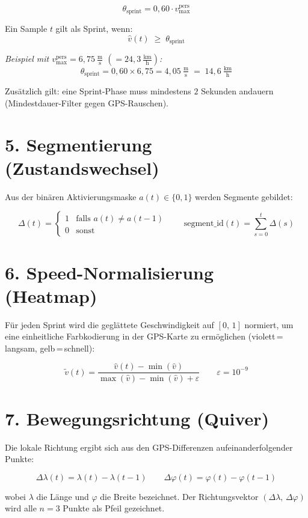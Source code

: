 \documentclass[a4paper, 11pt]{article}
\begin{document}
\[
  \theta_{\text{sprint}} = 0{,}60 \cdot v_{\max}^{\text{pers}}
\]

Ein Sample $t$ gilt als Sprint, wenn: \[\hat{v}(t) \;\geq\; \theta_{\text{sprint}}\]


\textit{Beispiel mit $v_{\max}^{\text{pers}} = 6{,}75\ \tfrac{\text{m}}{\text{s}}$
$(= 24{,}3\ \tfrac{\text{km}}{\text{h}})$:}
\[
  \theta_{\text{sprint}} = 0{,}60 \times 6{,}75 = 4{,}05\ \tfrac{\text{m}}{\text{s}}
  \;=\; 14{,}6\ \tfrac{\text{km}}{\text{h}}
\]

Zusätzlich gilt: eine Sprint-Phase muss mindestens $2$ Sekunden andauern
(Mindestdauer-Filter gegen GPS-Rauschen).

\section*{5. Segmentierung (Zustandswechsel)}

Aus der binären Aktivierungsmaske $a(t) \in \{0,1\}$ werden Segmente gebildet:

\[
  \Delta(t) =
  \begin{cases}
    1 & \text{falls } a(t) \neq a(t-1) \\
    0 & \text{sonst}
  \end{cases}
  \qquad
  \text{segment\_id}(t) = \sum_{s=0}^{t} \Delta(s)
\]

\section*{6. Speed-Normalisierung (Heatmap)}

Für jeden Sprint wird die geglättete Geschwindigkeit auf $[0,\,1]$ normiert,
um eine einheitliche Farbkodierung in der GPS-Karte zu ermöglichen
(violett\,=\,langsam, gelb\,=\,schnell):

\[
  \tilde{v}(t) = \frac{\hat{v}(t) - \min(\hat{v})}{\max(\hat{v}) - \min(\hat{v}) + \varepsilon}
  \qquad \varepsilon = 10^{-9}
\]

\section*{7. Bewegungsrichtung (Quiver)}

Die lokale Richtung ergibt sich aus den GPS-Differenzen aufeinanderfolgender Punkte:

\[
  \Delta\lambda(t) = \lambda(t) - \lambda(t-1)
  \qquad
  \Delta\varphi(t) = \varphi(t) - \varphi(t-1)
\]

wobei $\lambda$ die Länge und $\varphi$ die Breite bezeichnet. Der Richtungsvektor
$(\Delta\lambda,\, \Delta\varphi)$ wird alle $n = 3$ Punkte als Pfeil gezeichnet.
\end{document}
